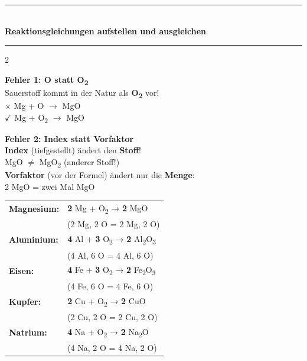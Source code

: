 \documentclass[9pt, a4paper]{article}
\newcommand{\seitentitel}[1]{%
    \noindent\textcolor{fachfarbe}{\rule{\textwidth}{1.5pt}}\\[-0.1em]
    {\Large\bfseries\textcolor{fachfarbe}{#1}}\\[-0.3em]
    \textcolor{fachfarbe}{\rule{\textwidth}{0.4pt}}
    \vspace{0.3em}
}
\newcommand{\abschnitt}[1]{%
    \vspace{6pt}%
    \noindent{\normalsize\bfseries\textcolor{fachfarbe}{#1}}%
    \vspace{2pt}%
    \nopagebreak[4]%
}
\begin{document}

\newpage

\seitentitel{Reaktionsgleichungen aufstellen und ausgleichen}

\begin{multicols}{2}

\abschnitt{Häufige Fehler vermeiden}

\begin{warnkasten}
\textbf{Fehler 1: O statt O\textsubscript{2}}\\
Sauerstoff kommt in der Natur als \textbf{O\textsubscript{2}} vor!\\
\textcolor{sauerstoff}{$\times$} Mg + O $\rightarrow$ MgO\\
\textcolor{fachfarbe}{$\checkmark$} Mg + O\textsubscript{2} $\rightarrow$ MgO
\end{warnkasten}

\vspace{4pt}

\begin{warnkasten}
\textbf{Fehler 2: Index statt Vorfaktor}\\
\textbf{Index} (tiefgestellt) ändert den \textbf{Stoff}!\\
MgO $\neq$ MgO\textsubscript{2} (anderer Stoff!)\\[0.3em]
\textbf{Vorfaktor} (vor der Formel) ändert nur die \textbf{Menge}:\\
2 MgO = zwei Mal MgO
\end{warnkasten}

\columnbreak

\abschnitt{Ausgeglichene Gleichungen}

\small
\begin{tabular}{@{}p{5cm}l@{}}
\textbf{Magnesium:} & \textbf{2} Mg + O\textsubscript{2} → \textbf{2} MgO \\
& {\scriptsize(2 Mg, 2 O = 2 Mg, 2 O)} \\[0.5em]
\textbf{Aluminium:} & \textbf{4} Al + \textbf{3} O\textsubscript{2} → \textbf{2} Al\textsubscript{2}O\textsubscript{3} \\
& {\scriptsize(4 Al, 6 O = 4 Al, 6 O)} \\[0.5em]
\textbf{Eisen:} & \textbf{4} Fe + \textbf{3} O\textsubscript{2} → \textbf{2} Fe\textsubscript{2}O\textsubscript{3} \\
& {\scriptsize(4 Fe, 6 O = 4 Fe, 6 O)} \\[0.5em]
\textbf{Kupfer:} & \textbf{2} Cu + O\textsubscript{2} → \textbf{2} CuO \\
& {\scriptsize(2 Cu, 2 O = 2 Cu, 2 O)} \\[0.5em]
\textbf{Natrium:} & \textbf{4} Na + O\textsubscript{2} → \textbf{2} Na\textsubscript{2}O \\
& {\scriptsize(4 Na, 2 O = 4 Na, 2 O)} \\
\end{tabular}

\end{multicols}
\end{document}
